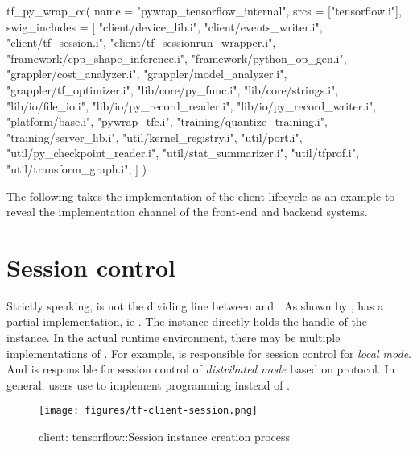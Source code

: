 \begin{content}
\begin{leftbar}
\begin{python}
tf_py_wrap_cc(
    name = "pywrap_tensorflow_internal",
    srcs = ["tensorflow.i"],
    swig_includes = [
        "client/device_lib.i",
        "client/events_writer.i",
        "client/tf_session.i",
        "client/tf_sessionrun_wrapper.i",
        "framework/cpp_shape_inference.i",
        "framework/python_op_gen.i",
        "grappler/cost_analyzer.i",
        "grappler/model_analyzer.i",
        "grappler/tf_optimizer.i",
        "lib/core/py_func.i",
        "lib/core/strings.i",
        "lib/io/file_io.i",
        "lib/io/py_record_reader.i",
        "lib/io/py_record_writer.i",
        "platform/base.i",
        "pywrap_tfe.i",
        "training/quantize_training.i",
        "training/server_lib.i",
        "util/kernel_registry.i",
        "util/port.i",
        "util/py_checkpoint_reader.i",
        "util/stat_summarizer.i",
        "util/tfprof.i",
        "util/transform_graph.i",
    ]
)
\end{python}
\end{leftbar}

The following takes the implementation of the client lifecycle as an example to reveal the implementation channel of the front-end  and backend \cpp{} systems.

\end{content}


\section{Session control}
\begin{content}
Strictly speaking,  is not the dividing line between  and . As shown by ,  has a partial \cpp{} implementation, ie . The  instance directly holds the handle of the  instance. In the actual runtime environment, there may be multiple implementations of . For example,  is responsible for session control for \emph{local mode}. And  is responsible for session control of \emph{distributed mode} based on  protocol. In general, users use  to implement programming instead of .

\begin{figure}[!htbp]
  \centering
  \texttt{[image: figures/tf-client-session.png]}
  \caption{client: tensorflow::Session instance creation process}
  \label{fig:tf-client-session}
\end{figure}

\end{content}


